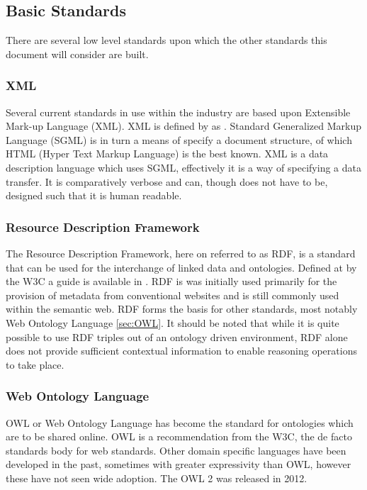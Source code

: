 \subsection{Basic Standards}
There are several low level standards upon which the other standards this document will consider are built.

\subsubsection{XML}
Several current standards in use within the industry are based upon Extensible Mark-up Language (XML). XML is defined by \citet{W3.org2013} as . Standard Generalized Markup Language (SGML) is in turn a means of specify a document structure, of which HTML (Hyper Text Markup Language) is the best known. XML is a data description language which uses SGML, effectively it is a way of specifying a data transfer. It is comparatively verbose and can, though does not have to be, designed such that it is human readable.  

\subsubsection{Resource Description Framework}
The Resource Description Framework, here on referred to as RDF, is a standard that can be used for the interchange of linked data and ontologies. Defined at by the W3C a guide is available in \citet{Wood14}. RDF is was initially used primarily for the provision of metadata from conventional websites and is still commonly used within the semantic web. RDF forms the basis for other standards, most notably Web Ontology Language \autoref{sec:OWL}. It should be noted that while it is quite possible to use RDF triples out of an ontology driven environment, RDF alone does not provide sufficient contextual information to enable reasoning operations to take place.

\subsubsection{Web Ontology Language}\label{sec:OWL}
OWL or Web Ontology Language has become the standard for ontologies which are to be shared online. OWL is a recommendation from the W3C, the de facto standards body for web standards. Other domain specific languages have been developed in the past, sometimes with greater expressivity than OWL, however these have not seen wide adoption. The OWL 2 was released in 2012.

